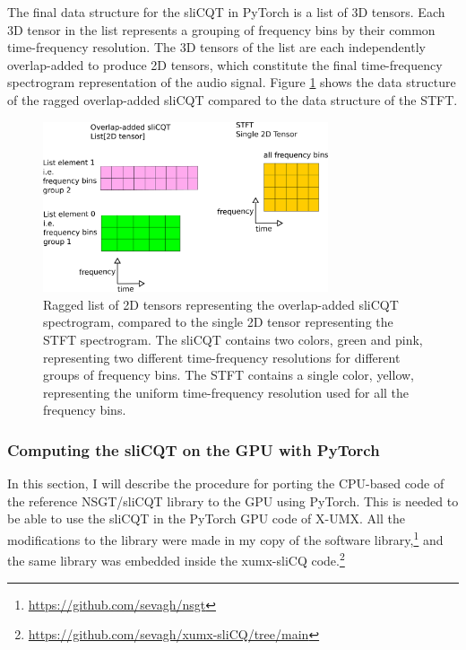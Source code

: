 \documentclass[report.tex]{subfiles}
\begin{document}
The final data structure for the sliCQT in PyTorch is a list of 3D tensors. Each 3D tensor in the list represents a grouping of frequency bins by their common time-frequency resolution. The 3D tensors of the list are each independently overlap-added to produce 2D tensors, which constitute the final time-frequency spectrogram representation of the audio signal. Figure \ref{fig:2dslicqolastft} shows the data structure of the ragged overlap-added sliCQT compared to the data structure of the STFT.

\begin{figure}[ht]
	\centering
	\includegraphics[width=0.75\textwidth]{./images-blockdiagrams/2dslicqolastft.png}
	\caption{Ragged list of 2D tensors representing the overlap-added sliCQT spectrogram, compared to the single 2D tensor representing the STFT spectrogram. The sliCQT contains two colors, green and pink, representing two different time-frequency resolutions for different groups of frequency bins. The STFT contains a single color, yellow, representing the uniform time-frequency resolution used for all the frequency bins.}
	\label{fig:2dslicqolastft}
\end{figure}

\subsubsection{Computing the sliCQT on the GPU with PyTorch}
\label{sec:torchslicq}

In this section, I will describe the procedure for porting the CPU-based code of the reference NSGT/sliCQT library to the GPU using PyTorch. This is needed to be able to use the sliCQT in the PyTorch GPU code of X-UMX. All the modifications to the library were made in my copy of the software library,\footnote{\url{https://github.com/sevagh/nsgt}} and the same library was embedded inside the xumx-sliCQ code.\footnote{\url{https://github.com/sevagh/xumx-sliCQ/tree/main}}
\end{document}
